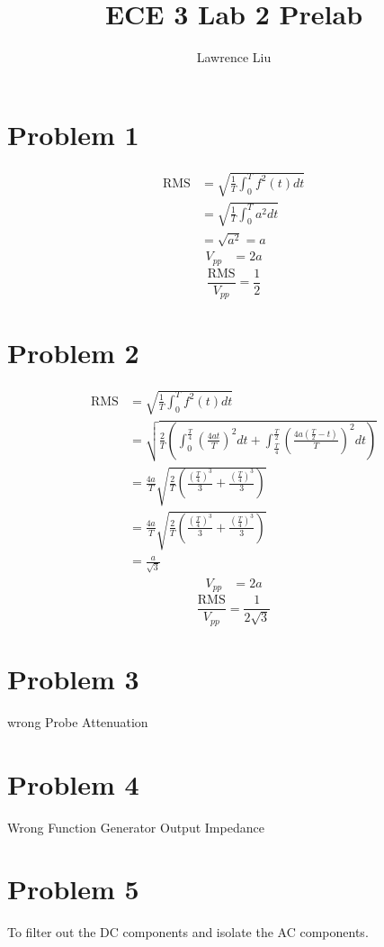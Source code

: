 \documentclass[12pt]{article}
\title{ECE 3 Lab 2 Prelab}
\author{Lawrence Liu}
\begin{document}
\maketitle
\section*{Problem 1}
\begin{align*}
\text{RMS}&=\sqrt{\frac{1}{T}\int_{0}^{T}f^2(t)dt}\\
&=\sqrt{\frac{1}{T}\int_{0}^{T}a^2dt}\\
&=\sqrt{a^2}=a
\end{align*}
\begin{align*}
V_{pp}&=2a
\end{align*}
$$\frac{\text{RMS}}{V_{pp}}=\boxed{\frac{1}{2}}$$
\section*{Problem 2}
\begin{align*}
\text{RMS}&=\sqrt{\frac{1}{T}\int_{0}^{T}f^2(t)dt}\\
&=\sqrt{\frac{2}{T}\left(\int_{0}^{\frac{T}{4}}\left(\frac{4at}{T}\right)^2dt+\int_{\frac{T}{4}}^{\frac{T}{2}}\left(\frac{4a(\frac{T}{2}-t)}{T}\right)^2dt\right)}\\
&=\frac{4a}{T}\sqrt{\frac{2}{T}\left(\frac{\left(\frac{T}{4}\right)^3}{3}+\frac{\left(\frac{T}{4}\right)^3}{3}\right)}\\
&=\frac{4a}{T}\sqrt{\frac{2}{T}\left(\frac{\left(\frac{T}{4}\right)^3}{3}+\frac{\left(\frac{T}{4}\right)^3}{3}\right)}\\
&=\frac{a}{\sqrt{3}}
\end{align*}
\begin{align*}
V_{pp}&=2a
\end{align*}
$$\frac{\text{RMS}}{V_{pp}}=\boxed{\frac{1}{2\sqrt{3}}}$$
\section*{Problem 3}
wrong Probe Attenuation 
\section*{Problem 4}
Wrong Function Generator Output Impedance
\section*{Problem 5}
To filter out the DC components and isolate the AC components.
\end{document}
